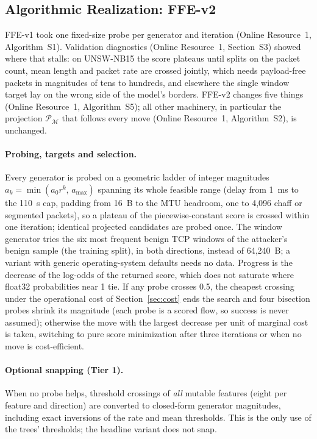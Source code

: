 \subsection{Algorithmic Realization: FFE-v2}
\label{sec:algorithm}

FFE-v1 took one fixed-size probe per generator and iteration (Online Resource~1, Algorithm~S1). Validation diagnostics (Online Resource~1, Section~S3) showed where that stalls: on UNSW-NB15 the score plateaus until splits on the packet count, mean length and packet rate are crossed jointly, which needs payload-free packets in magnitudes of tens to hundreds, and elsewhere the single window target lay on the wrong side of the model's borders. FFE-v2 changes five things (Online Resource~1, Algorithm~S5); all other machinery, in particular the projection $\mathcal{P}_{\mathcal{M}}$ that follows every move (Online Resource~1, Algorithm~S2), is unchanged.



\paragraph{Probing, targets and selection.} Every generator is probed on a geometric ladder of integer magnitudes $a_k=\min(a_0r^k,\,a_{\max})$ spanning its whole feasible range (delay from 1~ms to the 110~s cap, padding from 16~B to the MTU headroom, one to 4,096 chaff or segmented packets), so a plateau of the piecewise-constant score is crossed within one iteration; identical projected candidates are probed once. The window generator tries the six most frequent benign TCP windows of the attacker's benign sample (the training split), in both directions, instead of 64,240~B; a variant with generic operating-system defaults needs no data. Progress is the decrease of the log-odds of the returned score, which does not saturate where float32 probabilities near 1 tie. If any probe crosses 0.5, the cheapest crossing under the operational cost of Section~\ref{sec:cost} ends the search and four bisection probes shrink its magnitude (each probe is a scored flow, so success is never assumed); otherwise the move with the largest decrease per unit of marginal cost is taken, switching to pure score minimization after three iterations or when no move is cost-efficient.

\paragraph{Optional snapping (Tier 1).} When no probe helps, threshold crossings of \emph{all} mutable features (eight per feature and direction) are converted to closed-form generator magnitudes, including exact inversions of the rate and mean thresholds. This is the only use of the trees' thresholds; the headline variant does not snap.

